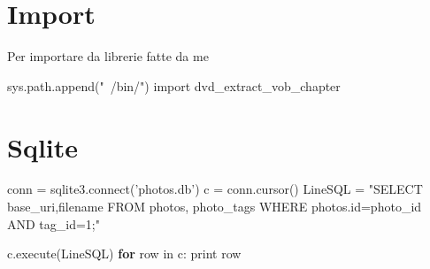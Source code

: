 \documentclass[]{article}
\newenvironment{Shaded}{}{}
\newcommand{\KeywordTok}[1]{\textcolor[rgb]{0.00,0.44,0.13}{\textbf{{#1}}}}
\newcommand{\DataTypeTok}[1]{\textcolor[rgb]{0.56,0.13,0.00}{{#1}}}
\newcommand{\CharTok}[1]{\textcolor[rgb]{0.25,0.44,0.63}{{#1}}}
\newcommand{\StringTok}[1]{\textcolor[rgb]{0.25,0.44,0.63}{{#1}}}
\newcommand{\OtherTok}[1]{\textcolor[rgb]{0.00,0.44,0.13}{{#1}}}
\newcommand{\NormalTok}[1]{{#1}}
\begin{document}
\section{Import}\label{import}

Per importare da librerie fatte da me

\begin{Shaded}
\begin{Highlighting}[]
\NormalTok{sys.path.append(}\StringTok{"~/bin/"}\NormalTok{)}
\CharTok{import} \NormalTok{dvd_extract_vob_chapter}
\end{Highlighting}
\end{Shaded}

\section{Sqlite}\label{sqlite}

\begin{Shaded}
\begin{Highlighting}[]
\NormalTok{conn = sqlite3.}\OtherTok{connect}\NormalTok{(}\StringTok{'photos.db'}\NormalTok{)}
\NormalTok{c = conn.cursor()}
\NormalTok{LineSQL = }\StringTok{"SELECT base_uri,filename FROM photos, photo_tags WHERE photos.id=photo_id AND tag_id=1;"}

\NormalTok{c.execute(LineSQL)}
\KeywordTok{for} \NormalTok{row in c:}
    \DataTypeTok{print} \NormalTok{row}
\end{Highlighting}
\end{Shaded}
\end{document}
